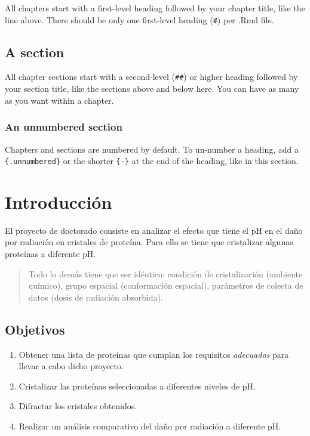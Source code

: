 \documentclass[
]{book}
\providecommand{\tightlist}{%
  \setlength{\itemsep}{0pt}\setlength{\parskip}{0pt}}
\theoremstyle{definition}
\theoremstyle{definition}
\theoremstyle{definition}
\theoremstyle{definition}
\theoremstyle{remark}
\begin{document}
All chapters start with a first-level heading followed by your chapter title, like the line above. There should be only one first-level heading (\texttt{\#}) per .Rmd file.

\hypertarget{a-section}{%
\section{A section}\label{a-section}}

All chapter sections start with a second-level (\texttt{\#\#}) or higher heading followed by your section title, like the sections above and below here. You can have as many as you want within a chapter.

\hypertarget{an-unnumbered-section}{%
\subsection*{An unnumbered section}\label{an-unnumbered-section}}

Chapters and sections are numbered by default. To un-number a heading, add a \texttt{\{.unnumbered\}} or the shorter \texttt{\{-\}} at the end of the heading, like in this section.

\hypertarget{intro}{%
\chapter{Introducción}\label{intro}}

El proyecto de doctorado consiste en analizar el efecto que tiene el pH en el daño por radiación en cristales de proteína. Para ello se tiene que cristalizar algunas proteínas a diferente pH.

\begin{quote}
Todo lo demás tiene que ser idéntico: condición de cristalización (ambiente químico), grupo espacial (conformación espacial), parámetros de colecta de datos (dosis de radiación absorbida).
\end{quote}

\hypertarget{objetivos}{%
\section{Objetivos}\label{objetivos}}

\begin{enumerate}
\def\labelenumi{\arabic{enumi}.}
\tightlist
\item
  Obtener una lista de proteínas que cumplan los requisitos \emph{adecuados} para llevar a cabo dicho proyecto.
\item
  Cristalizar las proteínas seleccionadas a diferentes niveles de pH.
\item
  Difractar los cristales obtenidos.
\item
  Realizar un análisis comparativo del daño por radiación a diferente pH.
\end{enumerate}
\end{document}
